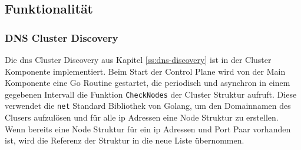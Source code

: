 \newpage
\subsection{Funktionalität}
\subsubsection{DNS Cluster Discovery}
Die \ac{dns} Cluster Discovery aus Kapitel \ref{ss:dns-discovery} ist in der Cluster Komponente implementiert.
Beim Start der Control Plane wird von der Main Komponente eine Go Routine gestartet, die periodisch und asynchron in einem gegebenen Intervall die Funktion \verb|CheckNodes| der Cluster Struktur aufruft.
Diese verwendet die \verb|net| Standard Bibliothek von Golang, um den Domainnamen des Clusers aufzulösen und für alle \ac{ip} Adressen eine Node Struktur zu erstellen.
Wenn bereits eine Node Struktur für ein \ac{ip} Adressen und Port Paar vorhanden ist, wird die Referenz der Struktur in die neue Liste übernommen.

